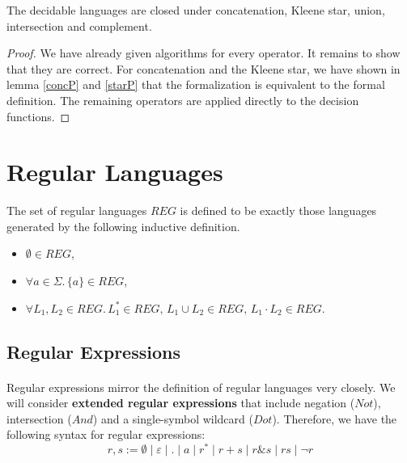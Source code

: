     \begin{theorem}{}
        \label{DecLangClosed}
        The decidable languages are closed under concatenation, Kleene star, union, intersection and complement. 
    \end{theorem}
    \begin{proof}
        We have already given algorithms for every operator. 
        It remains to show that they are correct.
        For concatenation and the Kleene star, we have shown in lemma \ref{concP} and \ref{starP} that the formalization is equivalent to the formal definition. 
        The remaining operators are applied directly to the decision functions. 
    \end{proof}

    \paragraph{}


    \section{Regular Languages}


    \begin{definition}{}
        \label{REG}
        The set of regular languages $REG$ is defined to be exactly those languages generated by the following inductive definition.
        \begin{itemize}
            \item
                $\emptyset \in REG$, 
            \item
                $\forall a \in \Sigma. \, \{a\} \in REG$, 
            \item
                $\forall L_1, L_2 \in REG. \, L_1^* \in REG, \, L_1 \cup L_2 \in REG, \, L_1 \cdot L_2 \in REG$.
        \end{itemize}
    \end{definition}


    \subsection{Regular Expressions}

    \paragraph{} 
    Regular expressions mirror the definition of regular languages very closely. 
    We will consider \textbf{extended regular expressions} that include negation ($Not$), intersection ($And$) and a single-symbol wildcard ($Dot$). 
    Therefore, we have the following syntax for regular expressions:
    \begin{equation*}
        r,s := \emptyset \; | \; \varepsilon \; | \; . \; | \; a \; | \; r^* \; | \; r + s \; | \; r \& s \; | \; r s \; | \; \neg r
    \end{equation*}
